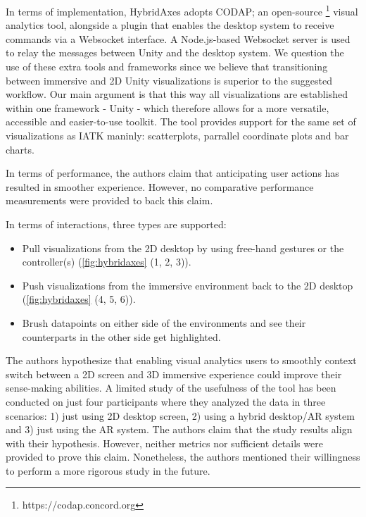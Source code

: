 \documentclass{vgtc}                          %
\begin{document}
\medskip

\noindent In terms of implementation, HybridAxes adopts CODAP; an open-source
\footnote{https://codap.concord.org} visual analytics tool, alongside a plugin
that enables the desktop system to receive commands via a Websocket interface.
A Node.js-based Websocket server is used to relay the messages between Unity
and the desktop system. We question the use of these extra tools and frameworks
since we believe that transitioning between immersive and 2D Unity
visualizations is superior to the suggested workflow. Our main argument is
that this way all visualizations are established within one framework - Unity -
which therefore allows for a more versatile, accessible and easier-to-use
toolkit. The tool provides support for the same set of visualizations as IATK
maninly: scatterplots, parrallel coordinate plots and bar charts.

\medskip

\noindent In terms of performance, the authors claim that anticipating user
actions has resulted in smoother experience. However, no comparative
performance measurements were provided to back this claim.

\smallskip

\noindent In terms of interactions, three types are supported:
\begin{itemize}
	\item Pull visualizations from the 2D desktop by using free-hand gestures
	      or the controller(s) (\cref{fig:hybridaxes} (1, 2, 3)).
	\item Push visualizations from the immersive environment back to the 2D
	      desktop (\cref{fig:hybridaxes} (4, 5, 6)).
	\item Brush datapoints on either side of the environments and see their
	      counterparts in the other side get highlighted.
\end{itemize}


\noindent The authors hypothesize that enabling visual analytics users to
smoothly context switch between a 2D screen and 3D immersive experience could
improve their sense-making abilities. A limited study of the usefulness of the
tool has been conducted on just four participants where they analyzed the data
in three scenarios: 1) just using 2D
desktop screen, 2) using a hybrid desktop/AR system and 3) just using the AR
system. The authors claim that the study results align with their hypothesis.
However, neither metrics nor sufficient details were provided to prove this
claim. Nonetheless, the authors mentioned their willingness to perform a more
rigorous study in the future.
\end{document}

